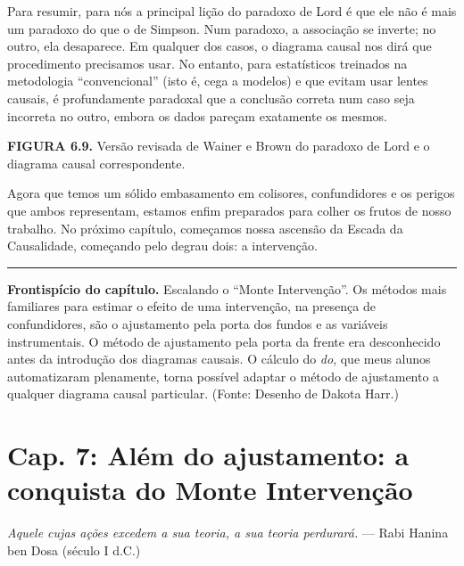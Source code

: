 \documentclass[11pt,a5paper,twoside]{book}
\begin{document}
Para resumir, para nós a principal lição do paradoxo de Lord é que ele não é mais um paradoxo do que o de Simpson. Num paradoxo, a associação se inverte; no outro, ela desaparece. Em qualquer dos casos, o diagrama causal nos dirá que procedimento precisamos usar. No entanto, para estatísticos treinados na metodologia “convencional” (isto é, cega a modelos) e que evitam usar lentes causais, é profundamente paradoxal que a conclusão correta num caso seja incorreta no outro, embora os dados pareçam exatamente os mesmos.

\textbf{FIGURA 6.9.} Versão revisada de Wainer e Brown do paradoxo de Lord e o diagrama causal correspondente.

Agora que temos um sólido embasamento em colisores, confundidores e os perigos que ambos representam, estamos enfim preparados para colher os frutos de nosso trabalho. No próximo capítulo, começamos nossa ascensão da Escada da Causalidade, começando pelo degrau dois: a intervenção.

\vspace{1em}\hrule\vspace{1em}
\textbf{Frontispício do capítulo.} Escalando o “Monte Intervenção”. Os métodos mais familiares para estimar o efeito de uma intervenção, na presença de confundidores, são o ajustamento pela porta dos fundos e as variáveis instrumentais. O método de ajustamento pela porta da frente era desconhecido antes da introdução dos diagramas causais. O cálculo do \textit{do}, que meus alunos automatizaram plenamente, torna possível adaptar o método de ajustamento a qualquer diagrama causal particular. (Fonte: Desenho de Dakota Harr.)

\chapter{Cap. 7: Além do ajustamento: a conquista do Monte Intervenção}
\textit{Aquele cujas ações excedem a sua teoria, a sua teoria perdurará.} — Rabi Hanina ben Dosa (século I d.C.)
\end{document}
